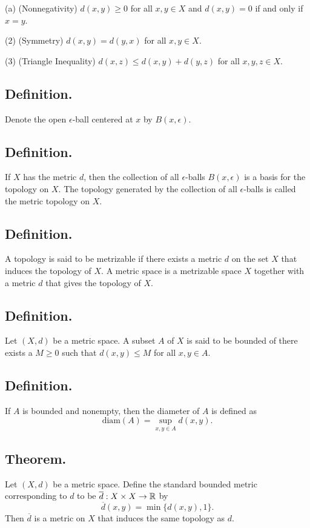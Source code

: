 \documentclass[titlepage]{article}
\begin{document}
(a) (Nonnegativity) $d(x, y) \geq 0$ for all $x, y \in X$ and $d(x, y) = 0$ if and only if $x = y$.

(2) (Symmetry) $d(x, y) = d(y, x)$ for all $x, y \in X$.

(3) (Triangle Inequality) $d(x, z) \leq d(x, y) + d(y, z)$ for all $x, y, z \in X$.

\subsection{Definition.} Denote the open $\epsilon$-ball centered at $x$ by $B(x, \epsilon)$.

\subsection{Definition.} If $X$ has the metric $d$, then the collection of all $\epsilon$-balls $B(x, \epsilon)$ is a basis for the topology on $X$. The topology generated by the collection of all $\epsilon$-balls is called the metric topology on $X$.

\subsection{Definition.} A topology is said to be metrizable if there exists a metric $d$ on the set $X$ that induces the topology of $X$. A metric space is a metrizable space $X$ together with a metric $d$ that gives the topology of $X$.

\subsection{Definition.} Let $(X, d)$ be a metric space. A subset $A$ of $X$ is said to be bounded of there exists a $M \geq 0$ such that $d(x, y) \leq M$ for all $x, y \in A$.

\subsection{Definition.} If $A$ is bounded and nonempty, then the diameter of $A$ is defined as 
$$\text{diam}(A) = \sup_{x, y \in A} d(x, y).$$

\subsection{Theorem.} Let $(X, d)$ be a metric space. Define the standard bounded metric corresponding to $d$ to be $\overline{d}: X \times X \to \mathbb{R}$ by 
$$\overline{d}(x, y) = \min \{d(x, y), 1\}.$$
Then $\overline{d}$ is a metric on $X$ that induces the same topology as $d$.
\end{document}
